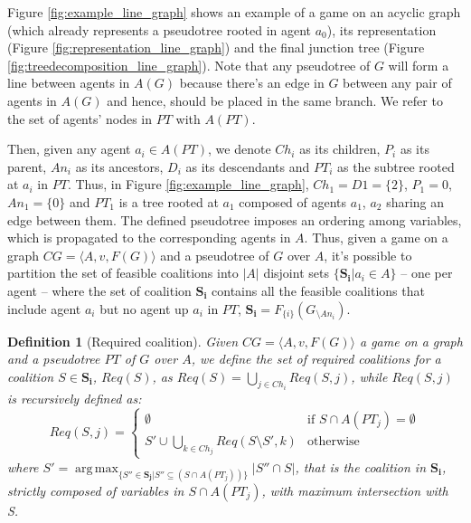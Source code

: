 \documentclass[11pt, twoside, titlepage, a4paper, openright]{report}
\newtheorem{Def}{Definition}
\begin{document}
\noindent Figure \ref{fig:example_line_graph} shows an example of a game on an acyclic graph (which already represents a pseudotree rooted in agent $a_0$), its representation (Figure \ref{fig:representation_line_graph}) and the final junction tree (Figure \ref{fig:treedecomposition_line_graph}). Note that any pseudotree of $G$ will form a line between agents in $A(G)$ because there's an edge in $G$ between any pair of agents in $A(G)$ and hence, should be placed in the same branch. We refer to the set of agents' nodes in $PT$ with $A(PT)$. 

\noindent Then, given any agent $a_i \in A(PT)$, we denote $Ch_i$ as its children, $P_i$ as its parent, $An_i$ as its ancestors, $D_i$ as its descendants and $PT_i$ as the subtree rooted at $a_i$ in $PT$. Thus, in Figure \ref{fig:example_line_graph}, $Ch_1 = D1 = \{2\}$, $P_1 = 0$, $An_1 = \{0\}$ and $PT_1$ is a tree rooted at $a_1$ composed of agents $a_1$, $a_2$ sharing an edge between them.
The defined pseudotree imposes an ordering among variables, which is propagated to the corresponding agents in $A$. Thus, given a game on a graph $CG=\langle A, v, F(G)\rangle$ and a pseudotree of $G$ over $A$, it's possible to partition the set of feasible coalitions into $|A|$ disjoint sets $\{\mathbf{S_i} |a_i \in A\}$ -- one per agent -- where the set of coalition $\mathbf{S_i}$ contains all the feasible coalitions that include agent $a_i$ but no agent up $a_i$ in $PT$, $\mathbf{S_i} = F_{\{i\}}(G_{\setminus An_i})$.

\begin{Def}[Required coalition]
Given $CG=\langle A, v, F(G)\rangle$ a game on a graph and a pseudotree $PT$ of $G$ over $A$, we define the set of required coalitions for a coalition $S \in \mathbf{S_i}$, $Req(S)$, as $Req(S)=\bigcup_{j\in Ch_i}Req(S,j)$, while $Req(S,j)$ is recursively defined as:
\begin{equation}\label{eq:req}Req(S,j) = \begin{cases}\emptyset & \mbox{if } S\cap A(PT_j)=\emptyset\\S'\cup\bigcup_{k\in Ch_j}Req(S\setminus S',k) & \mbox{otherwise}\end{cases}\end{equation}
where $S'=\operatorname{arg\,max}_{\{S''\in\mathbf{S_j}|S''\subseteq(S\cap A(PT_j))\}}|S''\cap S|$, that is the coalition in $\mathbf{S_i}$, strictly composed of variables in $S \cap A(PT_j)$, with maximum intersection with S.
\end{Def}
\end{document}
